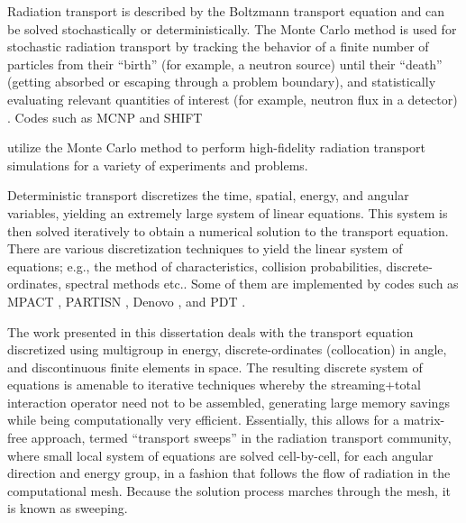 Radiation transport is described by the Boltzmann transport equation \cite{bell_glasstone,zweifel,davison,duderstadt} and can be solved stochastically or deterministically.
The Monte Carlo method is used for stochastic radiation transport by tracking the behavior of a finite number of particles from their ``birth'' (for example, a neutron source) until their ``death'' (getting absorbed or escaping through a problem boundary), and statistically evaluating relevant quantities of interest (for example, neutron flux in a detector) \cite{shultis_mc}.
Codes such as MCNP \cite{MCNP} and SHIFT {\cite{shift} utilize the Monte Carlo method to perform high-fidelity radiation transport simulations for a variety of experiments and problems.

Deterministic transport discretizes the time, spatial, energy, and angular variables, yielding an extremely large system of linear equations. This system is then solved iteratively to obtain a numerical solution to the transport equation.
There are various discretization techniques to yield the linear system of equations; e.g., the method of characteristics, collision probabilities, discrete-ordinates, spectral methods etc.. Some of them are  implemented by codes such as MPACT \cite{mpact}, PARTISN \cite{partisn}, Denovo \cite{denovo}, and PDT \cite{mpadams2013,mpadams2015}.

The work presented in this dissertation deals with the transport equation discretized using multigroup in energy, discrete-ordinates (collocation) in angle, and discontinuous finite elements in space. The resulting discrete system of equations is amenable to iterative techniques whereby the streaming+total interaction operator need not to be assembled, generating large memory savings while being computationally very efficient.  Essentially, this allows for a matrix-free approach, termed ``transport sweeps'' in the radiation transport community, where small local system of equations are solved cell-by-cell, for each angular direction and energy group, in a fashion that follows the flow of radiation in the computational mesh.
Because the solution process marches through the mesh, it is known as sweeping.

}
